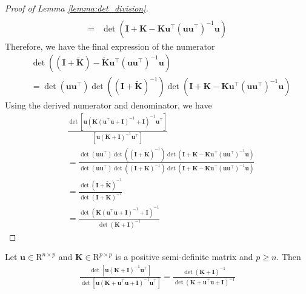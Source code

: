 \begin{proof}[Proof of Lemma \ref{lemma:det_division}]
\begin{align*}
\\ 
    = &  \det \left( \mathbf{I} + \mathbf{K} - \mathbf{K} \mathbf{u}^\top (\mathbf{u} \mathbf{u}^\top)^{-1}  \mathbf{u} \right)
\end{align*}
Therefore, we have the final expression of the numerator  
\begin{align*}
    &\det \left( (\mathbf{I} + \widetilde{\mathbf{K}}) - \widetilde{\mathbf{K}}\mathbf{u}^\top (\mathbf{u} \mathbf{u}^\top)^{-1} \mathbf{u}\right) 
\\
    &= \det (\mathbf{u} \mathbf{u}^\top) \det \left((\mathbf{I}+\widetilde{\mathbf{K}})^{-1}\right) \det \left( \mathbf{I} + \mathbf{K} - \mathbf{K} \mathbf{u}^\top (\mathbf{u} \mathbf{u}^\top)^{-1}  \mathbf{u} \right)
\end{align*}
Using the derived numerator and denominator, we have 
\begin{align*}
    & \frac{\det [\mathbf{u}\left(\mathbf{K}(\mathbf{u}^\top\mathbf{u}+\mathbf{I})^{-1} + \mathbf{I}\right)^{-1}\mathbf{u}^\top]}{[\mathbf{u}\left(\mathbf{K} + \mathbf{I}\right)^{-1}\mathbf{u}^\top]} 
\\
    &= \frac{\det (\mathbf{u} \mathbf{u}^\top) \det \left((\mathbf{I}+\widetilde{\mathbf{K}})^{-1}\right) \det \left( \mathbf{I} + \mathbf{K} - \mathbf{K} \mathbf{u}^\top (\mathbf{u} \mathbf{u}^\top)^{-1}  \mathbf{u} \right)}{\det (\mathbf{u} \mathbf{u}^\top) \det \left((\mathbf{I}+\mathbf{K})^{-1}\right) \det \left(\mathbf{I} + \mathbf{K} - \mathbf{K}\mathbf{u}^\top (\mathbf{u} \mathbf{u}^\top)^{-1} \mathbf{u}\right)}
\\
    &=\frac{\det (\mathbf{I}+\widetilde{\mathbf{K}})^{-1}}{\det (\mathbf{I}+\mathbf{K})^{-1}} 
\\
    &=\frac{\det \left(\mathbf{K}(\mathbf{u}^\top\mathbf{u}+\mathbf{I})^{-1} + \mathbf{I}\right)^{-1}}{\det \left(\mathbf{K} + \mathbf{I}\right)^{-1}}   
    \end{align*} 
\end{proof}
\begin{subcorollary}
\label{corollary:det_divison_corollary}
Let $\mathbf{u} \in \mathrm{R}^{n \times p}$ and $\mathbf{K} \in \mathrm{R}^{p \times p}$ is a positive semi-definite matrix and $p \ge n$. Then 
\begin{align*}
    \frac{\det[\mathbf{u}(\mathbf{K}+\mathbf{I})^{-1} \mathbf{u}^\top]}{\det [\mathbf{u}(\mathbf{K}+ \mathbf{u}^\top \mathbf{u} + \mathbf{I})^{-1} \mathbf{u}^\top]} = \frac{\det (\mathbf{K}+\mathbf{I})^{-1}}{\det(\mathbf{K}+\mathbf{u}^\top \mathbf{u}+\mathbf{I})^{-1}}
\end{align*}
\end{subcorollary}
